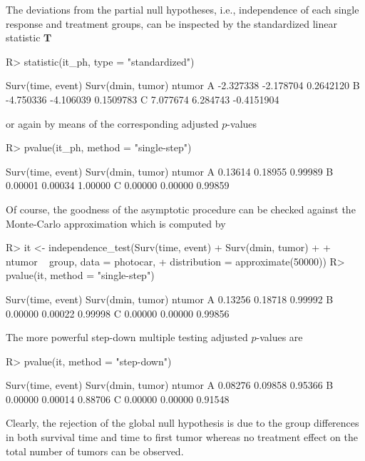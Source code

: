 \documentclass{article}
\newcommand{\T}{\mathbf{T}}
\newenvironment{Schunk}{}{}
\begin{document}
The deviations from the partial null hypotheses, i.e., independence of
each single response and treatment groups, can be inspected by the standardized
linear statistic $\T$
\begin{Schunk}
\begin{Sinput}
R> statistic(it_ph, type = "standardized")
\end{Sinput}
\begin{Soutput}
  Surv(time, event) Surv(dmin, tumor)     ntumor
A         -2.327338         -2.178704  0.2642120
B         -4.750336         -4.106039  0.1509783
C          7.077674          6.284743 -0.4151904
\end{Soutput}
\end{Schunk}
or again by means of the corresponding adjusted $p$-values
\begin{Schunk}
\begin{Sinput}
R> pvalue(it_ph, method = "single-step")
\end{Sinput}
\end{Schunk}
\begin{Schunk}
\begin{Soutput}
  Surv(time, event) Surv(dmin, tumor)  ntumor
A           0.13614           0.18955 0.99989
B           0.00001           0.00034 1.00000
C           0.00000           0.00000 0.99859
\end{Soutput}
\end{Schunk}
Of course, the goodness of the asymptotic procedure can be checked against
the Monte-Carlo approximation which is computed by
\begin{Schunk}
\begin{Sinput}
R> it <- independence_test(Surv(time, event) + Surv(dmin, tumor) + 
+     ntumor ~ group, data = photocar, 
+     distribution = approximate(50000))
R> pvalue(it, method = "single-step")
\end{Sinput}
\begin{Soutput}
  Surv(time, event) Surv(dmin, tumor)  ntumor
A           0.13256           0.18718 0.99992
B           0.00000           0.00022 0.99998
C           0.00000           0.00000 0.99856
\end{Soutput}
\end{Schunk}
The more powerful step-down multiple testing adjusted $p$-values 
\citep[Algorithm 2.8 in][]{WestfallYoung1993} are 
\begin{Schunk}
\begin{Sinput}
R> pvalue(it, method = "step-down")
\end{Sinput}
\begin{Soutput}
  Surv(time, event) Surv(dmin, tumor)  ntumor
A           0.08276           0.09858 0.95366
B           0.00000           0.00014 0.88706
C           0.00000           0.00000 0.91548
\end{Soutput}
\end{Schunk}
Clearly, the rejection of the global null hypothesis is due to the
group differences in both survival time and time to first tumor whereas 
no treatment effect on the total number of tumors can be observed.
\end{document}
